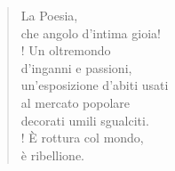 \begin{verse}
    La Poesia,\\
    che angolo d'intima gioia!\\!
    Un oltremondo\\
    d'inganni e passioni,\\
    un'esposizione d'abiti usati\\
    al mercato popolare\\
    decorati umili sgualciti.\\!
    È rottura col mondo,\\
    è ribellione.    
\end{verse}